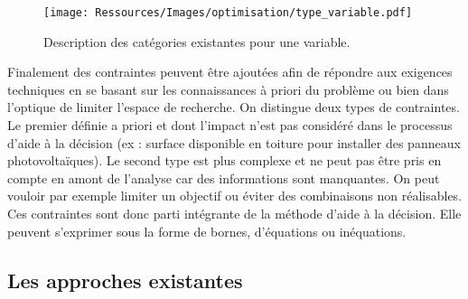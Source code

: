 \begin{figure}
    \begin{center}
        \texttt{[image: Ressources/Images/optimisation/type\_variable.pdf]}
    \end{center}
    \caption{Description des catégories existantes pour une variable.
             \label{fig:type_variable}}
\end{figure}

Finalement des contraintes peuvent être ajoutées afin de répondre aux exigences
techniques en se basant sur les connaissances à priori du problème ou bien dans
l’optique de limiter l’espace de recherche. On distingue deux types de contraintes.
Le premier définie a priori et dont l’impact n’est pas considéré dans le processus
d’aide à la décision (ex : surface disponible en toiture pour installer des
panneaux photovoltaïques).
Le second type est plus complexe et ne peut pas être pris en compte en amont de
l’analyse car des informations sont manquantes. On peut vouloir par exemple limiter
un objectif ou éviter des combinaisons non réalisables. Ces contraintes sont donc
parti intégrante de la méthode d’aide à la décision.
Elle peuvent s’exprimer sous la forme de bornes, d’équations ou inéquations.




\subsection{Les approches existantes} %
\label{sub:les_approches_existantes}
